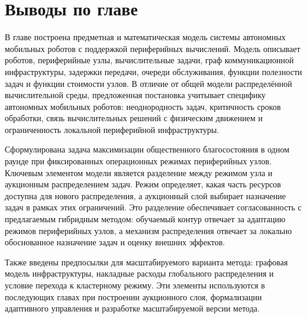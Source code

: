 \section{Выводы по главе}

В главе построена предметная и математическая модель системы автономных мобильных роботов с поддержкой периферийных вычислений. Модель описывает роботов, периферийные узлы, вычислительные задачи, граф коммуникационной инфраструктуры, задержки передачи, очереди обслуживания, функции полезности задач и функции стоимости узлов. В отличие от общей модели распределённой вычислительной среды, предложенная постановка учитывает специфику автономных мобильных роботов: неоднородность задач, критичность сроков обработки, связь вычислительных решений с физическим движением и ограниченность локальной периферийной инфраструктуры.

Сформулирована задача максимизации общественного благосостояния в одном раунде при фиксированных операционных режимах периферийных узлов. Ключевым элементом модели является разделение между режимом узла и аукционным распределением задач. Режим определяет, какая часть ресурсов доступна для нового распределения, а аукционный слой выбирает назначение задач в рамках этих ограничений. Это разделение обеспечивает согласованность с предлагаемым гибридным методом: обучаемый контур отвечает за адаптацию режимов периферийных узлов, а механизм распределения отвечает за локально обоснованное назначение задач и оценку внешних эффектов.

Также введены предпосылки для масштабируемого варианта метода: графовая модель инфраструктуры, накладные расходы глобального распределения и условие перехода к кластерному режиму. Эти элементы используются в последующих главах при построении аукционного слоя, формализации адаптивного управления и разработке масштабируемой версии метода.

